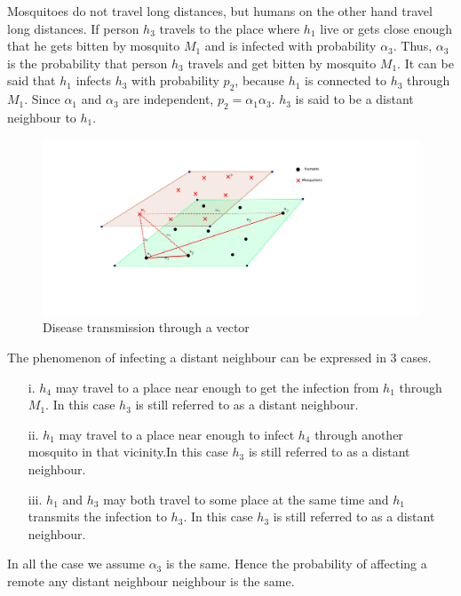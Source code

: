 Mosquitoes do not travel long distances, but humans on the other hand travel long distances. If person $h_3$ travels to the place where $h_1$ live or gets close enough that he gets bitten by mosquito $M_1$ and is infected with probability $\alpha_3$. Thus, $\alpha_3$ is the probability that person $h_3$ travels and get bitten by mosquito $M_1$. It can be said that $h_1$ infects $h_3$ with probability $p_2$, because $h_1$ is connected to $h_3$ through $M_1$. Since $\alpha_1$ and  $\alpha_3$ are independent, $p_2 = \alpha_1 \alpha_3$. $h_3$ is said to be a distant neighbour to $h_1$.
\begin{figure}[h!]
\centering
\includegraphics[scale=0.6]{images/human_mosquito.png}
\caption{Disease transmission through a vector} \label{fig5}
\end{figure}
The phenomenon of infecting a distant neighbour can be expressed in 3 cases. 
\begin{itemize}
\item[i.] $h_4$ may travel to a place near enough to get the infection from $h_1$ through $M_1$. In this case $h_3$ is still referred to as a distant neighbour.
\item[ii.] $ h_1$ may travel to a place near enough to infect $h_4$  through another mosquito in that vicinity.In this case $h_3$ is still referred to as a distant neighbour.
\item[iii.] $h_1$  and $h_3$ may both travel to some place at the same time and $h_1$ transmits the infection to $h_3$. In this case $h_3$ is still referred to as a distant neighbour.
\end{itemize}

In all the case we assume $\alpha_3$ is the same. Hence the probability of affecting a remote any distant neighbour neighbour is the same. 

